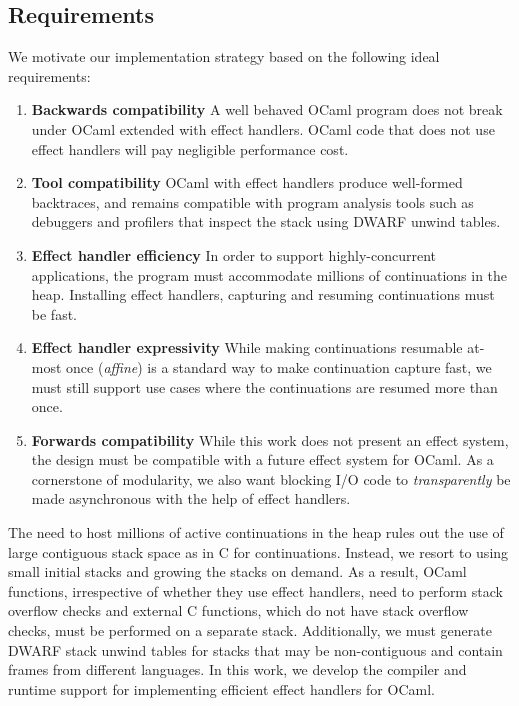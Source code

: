 \documentclass[sigplan,10pt,review,anonymous]{acmart}\settopmatter{printfolios=true,printccs=false,printacmref=false}
\begin{document}
\subsection{Requirements}
\label{sec:requirements}

We motivate our implementation strategy based on the following ideal
requirements:

\begin{enumerate}[label=R\arabic*]
	\item \textbf{Backwards compatibility} A well behaved OCaml program does not
		break under OCaml extended with effect handlers. OCaml code that does not
		use effect handlers will pay negligible performance cost.
	\item \textbf{Tool compatibility} OCaml with effect handlers produce
		well-formed backtraces, and remains compatible with program analysis tools
		such as debuggers and profilers that inspect the stack using DWARF unwind
		tables.
	\item \textbf{Effect handler efficiency} In order to support
		highly-concurrent applications, the program must accommodate millions of
		continuations in the heap. Installing effect handlers, capturing and
		resuming continuations must be fast.
	\item \textbf{Effect handler expressivity} While making continuations
		resumable at-most once (\emph{affine}) is a standard way to make
		continuation capture fast, we must still support use cases where the
		continuations are resumed more than once.
\fi
	\item \textbf{Forwards compatibility} While this work does not present an
		effect system, the design must be compatible with a future effect system
		for OCaml. As a cornerstone of modularity, we also want blocking I/O code
		to \emph{transparently} be made asynchronous with the help of effect
		handlers.
\end{enumerate}

The need to host millions of active continuations in the heap rules out the use
of large contiguous stack space as in C for continuations. Instead, we resort
to using small initial stacks and growing the stacks on demand. As a result,
OCaml functions, irrespective of whether they use effect handlers, need to
perform stack overflow checks and external C functions, which do not have stack
overflow checks, must be performed on a separate stack. Additionally, we must
generate DWARF stack unwind tables for stacks that may be non-contiguous and
contain frames from different languages. In this work, we develop the compiler
and runtime support for implementing efficient effect handlers for OCaml.
\end{document}
